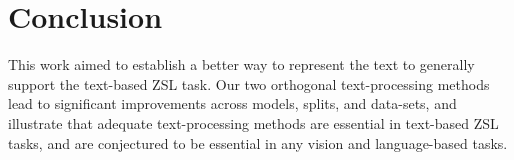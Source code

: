 \documentclass[11pt,a4paper]{article}
\newcommand\reut[1]{\textcolor{green}{\textbf{REUT:} #1 }}
\begin{document}
\par



\section{Conclusion}
\label{conclusion}

This work aimed to establish a better way to represent the text to generally support the text-based ZSL task. Our two orthogonal text-processing methods lead to significant improvements across models, splits, and data-sets, and illustrate that adequate text-processing methods are essential in text-based ZSL tasks,  and are  conjectured to be essential in any vision and language-based tasks. 




\end{document}
